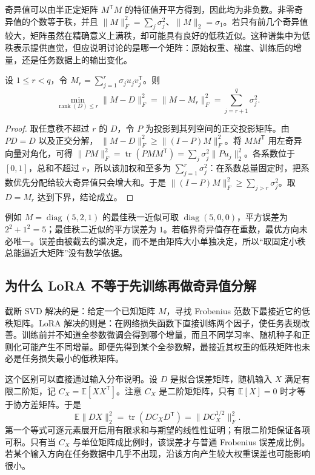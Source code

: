\documentclass[UTF8,12pt,a4paper,fontset=fandol]{ctexart}
\begin{document}
奇异值可以由半正定矩阵 $M^{\mathsf T}M$ 的特征值开平方得到，因此均为非负数。非零奇异值的个数等于秩，并且
$\|M\|_F^2=\sum_j\sigma_j^2$、$\|M\|_2=\sigma_1$。若只有前几个奇异值较大，矩阵虽然在精确意义上满秩，却可能具有良好的低秩近似。这种谱集中为低秩表示提供直觉，但应说明讨论的是哪一个矩阵：原始权重、梯度、训练后的增量，还是任务数据上的输出变化。

\begin{theorem}[截断奇异值分解的最小平方误差]
\label{thm:truncated-svd}
设 $1\leq r<q$，令 $M_r=\sum_{j=1}^{r}\sigma_ju_jv_j^{\mathsf T}$。则
\[
\min_{\operatorname{rank}(D)\leq r}\|M-D\|_F^2
=\|M-M_r\|_F^2=\sum_{j=r+1}^{q}\sigma_j^2.
\]
\end{theorem}

\begin{proof}
取任意秩不超过 $r$ 的 $D$，令 $P$ 为投影到其列空间的正交投影矩阵。由 $PD=D$ 以及正交分解，
$\|M-D\|_F^2\geq\|(I-P)M\|_F^2$。将 $MM^{\mathsf T}$ 用左奇异向量对角化，可得
$\|PM\|_F^2=\operatorname{tr}(PMM^{\mathsf T})
=\sum_j\sigma_j^2\|Pu_j\|_2^2$。各系数位于 $[0,1]$，总和不超过 $r$，所以该加权和至多为 $\sum_{j=1}^r\sigma_j^2$：在系数总量固定时，把系数优先分配给较大奇异值只会增大和。于是
$\|(I-P)M\|_F^2\geq\sum_{j>r}\sigma_j^2$。取 $D=M_r$ 达到下界，结论成立。
\end{proof}

例如 $M=\operatorname{diag}(5,2,1)$ 的最佳秩一近似可取
$\operatorname{diag}(5,0,0)$，平方误差为 $2^2+1^2=5$；最佳秩二近似的平方误差为 $1$。若临界奇异值存在重数，最优方向未必唯一。误差由被截去的谱决定，而不是由矩阵大小单独决定，所以“取固定小秩总能逼近大矩阵”没有数学依据。

\subsection{为什么 LoRA 不等于先训练再做奇异值分解}

截断 SVD 解决的是：给定一个已知矩阵 $M$，寻找 Frobenius 范数下最接近它的低秩矩阵。LoRA 解决的则是：在网络损失函数下直接训练两个因子，使任务表现改善。训练前并不知道全参数微调会得到哪个增量，而且不同学习率、随机种子和正则化可能产生不同增量。即便先得到某个全参数解，最接近其权重的低秩矩阵也未必是任务损失最小的低秩矩阵。

这个区别可以直接通过输入分布说明。设 $D$ 是拟合误差矩阵，随机输入 $X$ 满足有限二阶矩，记 $C_X=\mathbb E[XX^{\mathsf T}]$。注意 $C_X$ 是二阶矩矩阵，只有 $\mathbb E[X]=0$ 时才等于协方差矩阵。于是
\begin{equation}
\mathbb E\|DX\|_2^2
=\operatorname{tr}(DC_XD^{\mathsf T})
=\|DC_X^{1/2}\|_F^2.
\label{eq:data-weighted-error}
\end{equation}
第一个等式可逐元素展开后用有限求和与期望的线性性证明；有限二阶矩保证各项可积。只有当 $C_X$ 与单位矩阵成比例时，该误差才与普通 Frobenius 误差成比例。若某个输入方向在任务数据中几乎不出现，沿该方向产生较大权重误差也可能影响很小。
\end{document}
